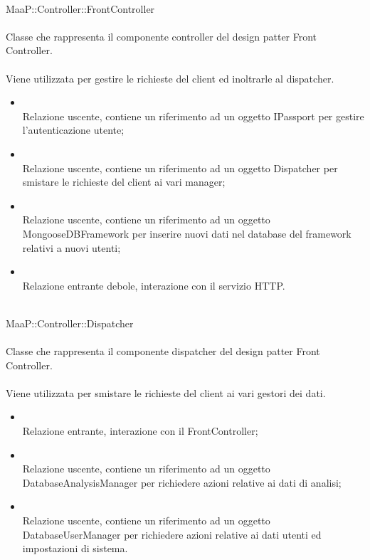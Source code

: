 	\\
	MaaP::Controller::FrontController\\
	\\
	Classe che rappresenta il componente controller del design patter Front Controller.\\
	\\
	Viene utilizzata per gestire le richieste del client ed inoltrarle al dispatcher.
	\begin{itemize}
	\item{}\\
	Relazione uscente, contiene un riferimento ad un oggetto IPassport per gestire l'autenticazione utente;
	\item{}\\
	Relazione uscente, contiene un riferimento ad un oggetto Dispatcher per smistare le richieste del client ai vari manager;
	\item{}\\
	Relazione uscente, contiene un riferimento ad un oggetto MongooseDBFramework per inserire nuovi dati nel database del framework relativi a nuovi utenti;
	\item{}\\
	Relazione entrante debole, interazione con il servizio HTTP.
	\end{itemize}
	
	\\
	MaaP::Controller::Dispatcher\\
	\\
	Classe che rappresenta il componente dispatcher del design patter Front Controller.\\
	\\
	Viene utilizzata per smistare le richieste del client ai vari gestori dei dati.
	\begin{itemize}
	\item{}\\
	Relazione entrante, interazione con il FrontController;
	\item{}\\
	Relazione uscente, contiene un riferimento ad un oggetto DatabaseAnalysisManager per richiedere azioni relative ai dati di analisi;
	\item{}\\
	Relazione uscente, contiene un riferimento ad un oggetto DatabaseUserManager per richiedere azioni relative ai dati utenti ed impostazioni di sistema.
	\end{itemize}


